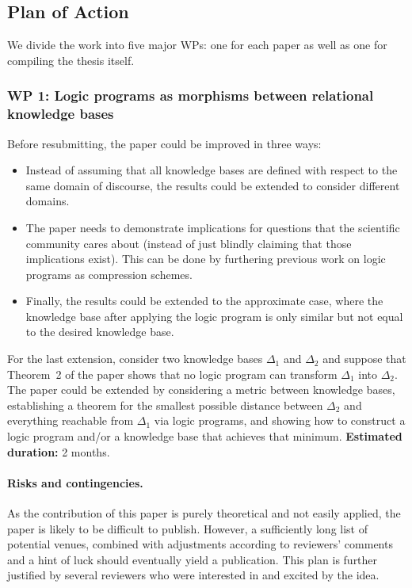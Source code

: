 \documentclass{article}
\begin{document}
\subsection{Plan of Action} \label{sec:plan}

We divide the work into five major WPs: one for each paper as well as one for
compiling the thesis itself.

\subsubsection{WP 1: Logic programs as morphisms between relational knowledge
  bases}

Before resubmitting, the paper could be improved in three ways:
\begin{itemize}
\item Instead of assuming that all knowledge bases are defined with respect to
  the same domain of discourse, the results could be extended to consider
  different domains.
\item The paper needs to demonstrate implications for questions that the
  scientific community cares about (instead of just blindly claiming that those
  implications exist). This can be done by furthering previous work
  \cite{DBLP:conf/ijcai/DumancicGMB19} on logic programs as compression schemes.
\item Finally, the results could be extended to the approximate case, where the
  knowledge base after applying the logic program is only similar but not equal
  to the desired knowledge base.
\end{itemize}
For the last extension, consider two knowledge bases $\Delta_1$ and $\Delta_2$
and suppose that Theorem~2 of the paper shows that no logic program can
transform $\Delta_1$ into $\Delta_2$. The paper could be extended by considering
a metric between knowledge bases, establishing a theorem for the smallest
possible distance between $\Delta_2$ and everything reachable from $\Delta_1$
via logic programs, and showing how to construct a logic program and/or a
knowledge base that achieves that minimum. {\bf Estimated duration:} 2 months.

\paragraph{Risks and contingencies.} As the contribution of this paper is purely
theoretical and not easily applied, the paper is likely to be difficult to
publish. However, a sufficiently long list of potential venues, combined with
adjustments according to reviewers' comments and a hint of luck should
eventually yield a publication. This plan is further justified by several
reviewers who were interested in and excited by the idea.
\end{document}
